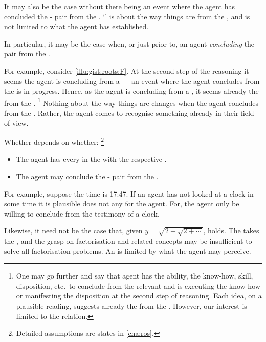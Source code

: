 \begin{note}
  It may also be the case  without there being an event where the agent has concluded the - pair from the \pool{}.
  `' is about the way things are from the \agpe{}, and is not limited to what the agent has established.

  In particular, it may be the case  when, or just prior to, an agent \emph{concluding} the - pair from the \pool{}.

  For example, consider \autoref{illu:gist:roots:F}.
  At the second step of the \agents{} reasoning it seems the agent is concluding  from a \pool{} --- an event where the agent concludes  from the \pool{} is in progress.
  Hence, as the agent is concluding  from a \pool{}, it seems  already \fof{} the \pool{} from the \agpe{}.%
  \footnote{
    One may go further and say that agent has the ability, the know-how, skill, disposition, etc.\ to conclude  from the relevant \pool{} and is executing the know-how or manifesting the disposition at the second step of reasoning.
    Each idea, on a plausible reading, suggests  already \fof{} the \pool{} from the \agpe{}.
    However, our interest is limited to the relation.
  }
  Nothing about the way things are changes when the agent concludes  from the \pool{}.
  Rather, the agent comes to recognise something already in their field of view.

  Whether  depends on whether:%
  \footnote{
    Detailed assumptions are states in \autoref{cha:ros}.
  }
  \begin{itemize}
  \item
    The agent has \evaled{} every  in the \pool{} with the respective .
  \item
    The agent may conclude the - pair from the \pool{}.
  \end{itemize}
  For example, suppose the time is 17:47.
  If an agent has not looked at a clock in some time it is plausible  does not  any \pool{} for the agent.
  For, the agent only be willing to conclude  from the testimony of a clock.

  Likewise, it need not be the case that, given \(y = \sqrt{2 + \sqrt{2 + \cdots}}\),  holds.
  The \fofr{} takes the \agpe{}, and the \agents{} grasp on factorisation and related concepts may be insufficient to solve all factorisation problems.
  An \agpe{} is limited by what the agent may perceive.
\end{note}


